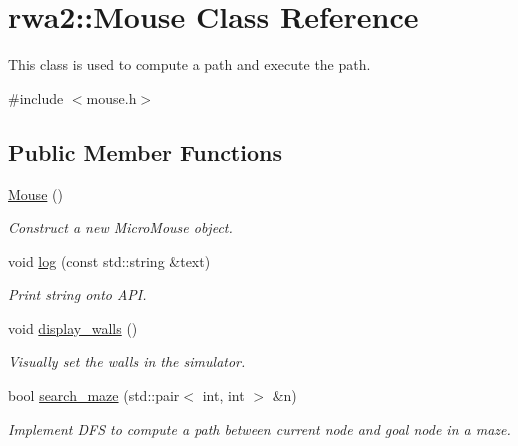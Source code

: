 \hypertarget{classrwa2_1_1_mouse}{}\section{rwa2\+:\+:Mouse Class Reference}
\label{classrwa2_1_1_mouse}


This class is used to compute a path and execute the path.  




{\ttfamily \#include $<$mouse.\+h$>$}

\subsection*{Public Member Functions}
\begin{DoxyCompactItemize}
\item 
\hyperlink{classrwa2_1_1_mouse_a048dffae3aaa3a6ddc2c6cc4741a097c}{Mouse} ()
\begin{DoxyCompactList}\small\item\em Construct a new Micro\+Mouse object. \end{DoxyCompactList}\item 
void \hyperlink{classrwa2_1_1_mouse_a6bbb329ddb93efbab9f7c91134cc1d44}{log} (const std\+::string \&text)
\begin{DoxyCompactList}\small\item\em Print string onto A\+PI. \end{DoxyCompactList}\item 
\mbox{\label{classrwa2_1_1_mouse_abbcc99c41fd073426fdfd790f947956e}} 
void \hyperlink{classrwa2_1_1_mouse_abbcc99c41fd073426fdfd790f947956e}{display\+\_\+walls} ()
\begin{DoxyCompactList}\small\item\em Visually set the walls in the simulator. \end{DoxyCompactList}\item 
bool \hyperlink{classrwa2_1_1_mouse_a66b3d6d831d814a569401158b07f9e83}{search\+\_\+maze} (std\+::pair$<$ int, int $>$ \&n)
\begin{DoxyCompactList}\small\item\em Implement D\+FS to compute a path between current node and goal node in a maze. \end{DoxyCompactList}\item 
\mbox{\label{classrwa2_1_1_mouse_afc6e0d56e3a777c05efa3929eb256e0a}} 

\end{DoxyCompactItemize}
